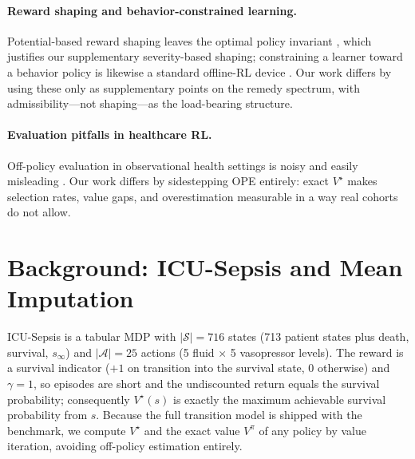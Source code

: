 \documentclass{article}
\begin{document}
\paragraph{Reward shaping and behavior-constrained learning.}
Potential-based reward shaping leaves the optimal policy invariant
\citep{ng1999reward}, which justifies our supplementary severity-based shaping;
constraining a learner toward a behavior policy is likewise a standard offline-RL
device \citep{wu2019behavior,nair2020awac}.
Our work differs by using these only as supplementary points on the remedy
spectrum, with admissibility---not shaping---as the load-bearing structure.

\paragraph{Evaluation pitfalls in healthcare RL.}
Off-policy evaluation in observational health settings is noisy and easily
misleading \citep{gottesman2019guidelines,gottesman2018evaluating}. Our work
differs by sidestepping OPE entirely: exact $V^\star$ makes selection rates,
value gaps, and overestimation measurable in a way real cohorts do not allow.

\section{Background: ICU-Sepsis and Mean Imputation}
\label{sec:background}
ICU-Sepsis \citep{choudhary2024icusepsis} is a tabular MDP with $|\mathcal{S}|{=}716$
states (713 patient states plus death, survival, $s_\infty$) and $|\mathcal{A}|{=}25$
actions (5 fluid $\times$ 5 vasopressor levels). The reward is a survival indicator
(${+}1$ on transition into the survival state, $0$ otherwise) and $\gamma{=}1$, so
episodes are short and the undiscounted return equals the survival probability;
consequently $V^\star(s)$ is exactly the maximum achievable survival probability
from $s$. Because the full transition model is shipped with the benchmark, we
compute $V^\star$ and the exact value $V^\pi$ of any policy by value iteration,
avoiding off-policy estimation entirely.
\end{document}
